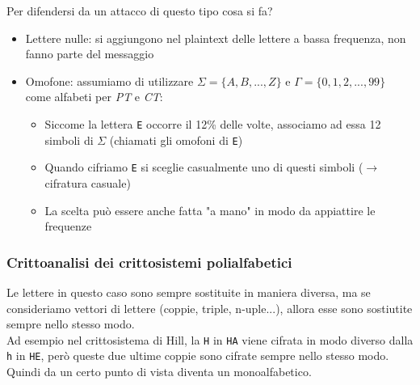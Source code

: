 Per difendersi da un attacco di questo tipo cosa si fa?
\begin{itemize}
	\item Lettere nulle: si aggiungono nel plaintext delle lettere a bassa frequenza, non fanno parte del messaggio
	\item Omofone: assumiamo di utilizzare $\Sigma=\{A,B, ...,Z\}$ e $\Gamma=\{0,1,2,...,99\}$ come alfabeti per \textit{PT} e \textit{CT}:
	\begin{itemize}
		\item Siccome la lettera \texttt{E} occorre il 12\% delle volte, associamo ad essa 12 simboli di $\Sigma$ (chiamati gli omofoni di \texttt{E})
		\item Quando cifriamo \texttt{E} si sceglie casualmente uno di questi simboli ($\rightarrow$ cifratura casuale)
		\item La scelta può essere anche fatta "a mano" in modo da appiattire le frequenze
	\end{itemize}
\end{itemize}

\subsubsection*{Crittoanalisi dei crittosistemi polialfabetici}
Le lettere in questo caso sono sempre sostituite in maniera diversa, ma se consideriamo vettori di lettere (coppie, triple, n-uple...), allora esse sono sostiutite sempre nello stesso modo.\\
Ad esempio nel crittosistema di Hill, la \texttt{H} in \texttt{HA} viene cifrata in modo diverso dalla \texttt{h} in \texttt{HE}, però queste due ultime coppie sono cifrate sempre nello stesso modo.
Quindi da un certo punto di vista diventa un monoalfabetico.